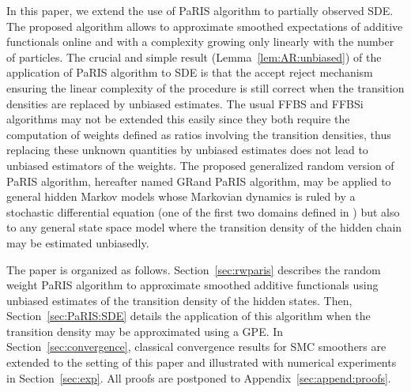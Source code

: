 \documentclass[12pt,draft]{article}
\newcommand{\1}{\mathrm{1}}
\begin{document}
In this paper, we extend the use of  PaRIS algorithm to partially observed SDE. 
The proposed algorithm allows to approximate smoothed expectations of additive functionals online and with a complexity growing only linearly with the number of particles. The crucial and simple result (Lemma~\ref{lem:AR:unbiased}) of the application of PaRIS algorithm to SDE is that the accept reject mechanism ensuring the linear complexity of the procedure is still correct when the transition densities are replaced by unbiased estimates. The usual FFBS and FFBSi algorithms may not be extended this easily since they both require the computation of weights defined as ratios involving the transition densities, thus replacing these unknown quantities by unbiased estimates does not lead to unbiased estimators of the weights. The proposed generalized random version of PaRIS algorithm, hereafter named GRand PaRIS algorithm, may be applied to general hidden Markov models whose Markovian dynamics is ruled by a stochastic differential equation (one of the first two domains defined in \cite{beskos:papaspiliopoulos:roberts:fearnhead:2006}) but also to any general state space model where the transition density of the hidden chain may be estimated unbiasedly.

The paper is organized as follows. Section~\ref{sec:rwparis} describes the random weight PaRIS algorithm to approximate smoothed additive functionals using unbiased estimates of the transition density of the hidden states. 
Then, Section~\ref{sec:PaRIS:SDE} details the application of this algorithm when the transition density may be approximated using a GPE. 
In Section~\ref{sec:convergence}, classical convergence results for SMC smoothers are extended to the setting of this paper and illustrated with numerical experiments in Section~\ref{sec:exp}. 
All proofs are postponed to Appendix~\ref{sec:append:proofs}.
\end{document}
